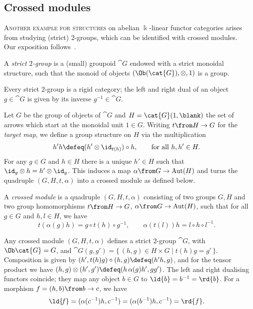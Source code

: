 \subsection{Crossed modules}\label{sec:2-groups}

\textsc{Another example for \GV{} structures} on abelian \(\Bbbk\)\hyp{}linear functor categories arises from studying (strict) 2-groups,
which can be identified with crossed modules.
Our exposition follows~\cite{wagemann2021:CrossedModules}.

\begin{definition}\label{def:str-2-grp}
  A \emph{strict \(2\)\hyp{}group} is a (small) groupoid \(\cat{G}\) endowed with a strict monoidal structure,
  such that the monoid of objects \((\Ob(\cat{G}), \otimes,1)\) is a group.
\end{definition}

Every strict 2-group is a rigid category;
the left and right dual of an object \(g \in \cat{G}\) is given by its inverse \(g^{-1} \in \cat{G}\).

Let \(G\) be the group of objects of \(\cat{G}\) and \(H = \cat{G}(1, \blank)\) the set of arrows which start at the monoidal unit \(1\in G\).
Writing \(t \from H \to G \) for the \emph{target map},
we define a group structure on \(H\) via the multiplication
\[
  h' h \defeq (h' \otimes \id_{t(h)}) \circ h, \qquad \text{for all }h,h' \in H.
\]
For any \(g\in G\) and \(h\in H\) there is a unique \(h' \in H\) such that \(\id_g\otimes h = h' \otimes \id_g\).
This induces a map \(\alpha \from G \to \mathrm{Aut}(H)\) and turns the quadruple \((G, H, t, \alpha)\) into a crossed module as defined below.

\begin{definition}\label{def:crossed-module}
  A \emph{crossed module} is a quadruple \((G,H,t,\alpha)\)
  consisting of two groups \(G,H\)
  and two group homomorphisms \(t \from H \to G\), \(\alpha \from G \to \mathrm{Aut}(H)\),
  such that for all \(g \in G\) and \(h,l \in H\), we have
  \begin{equation}\label{eq:cross-mod-def-rel}
    t(\alpha(g)h) = g \circ t(h) \circ g^{-1}, \qquad
    \alpha(t(l))h = l \circ h \circ l^{-1}.
  \end{equation}
\end{definition}

\begin{remark}\label{rmk:crossed-modules-and-2-groups}
  Any crossed module \((G,H,t,\alpha)\) defines a strict \(2\)\hyp{}group \(\cat{G}\),
  with \(\Ob\cat{G}=G\), and \(\cat{G}(g,g') =\{\, (h,g) \in H \times G \mid t(h)g=g'\,\}\).
  Composition is given by \((h', t(h)g)\circ(h,g) \defeq (h'h,g)\),
  and for the tensor product we have \((h,g) \otimes (h', g') \defeq (h\,\alpha(g)h', g g')\).
  The left and right dualising functors coincide;
  they map any object \(b \in G\) to \(\ld{b}=b^{-1}=\rd{b}\).
  For a morphism \(f=(h,b)\from b \to c\), we have
  \[
    \ld{\!{}f}  =(\alpha(c^{-1})h, c^{-1}) = (\alpha(b^{-1})h, c^{-1}) = \rd{f}.
  \]
\end{remark}

